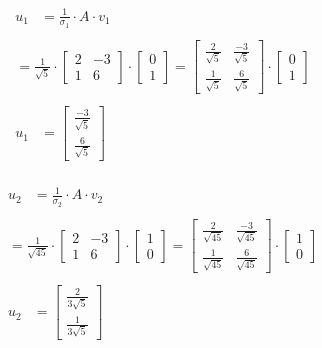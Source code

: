 \documentclass[a4paper]{report}
\begin{document}
\begin{align*}
\begin{split}
    u_1&=\frac{1}{\sigma_1}\cdot A\cdot v_1 
\end{split}\\
\begin{split}
    = \frac{1}{\sqrt{5}} \cdot\begin{bmatrix}
    2&-3\\1&6
\end{bmatrix} \cdot \begin{bmatrix}
    0\\1
\end{bmatrix} = \begin{bmatrix}
    \frac{2}{\sqrt{5}}&\frac{-3}{\sqrt{5}}\\\frac{1}{\sqrt{5}}&\frac{6}{\sqrt{5}}
\end{bmatrix} \cdot \begin{bmatrix}
    0\\1
\end{bmatrix}
\end{split} \\
\begin{split}
        u_1&= \begin{bmatrix}
    \frac{-3}{\sqrt{5}} \\ \frac{6}{\sqrt{5}}
\end{bmatrix}
\end{split}
\end{align*}



\begin{align*}
    \begin{split}
        u_2&=\frac{1}{\sigma_2}\cdot A\cdot v_2
    \end{split} \\
    \begin{split}
        = \frac{1}{\sqrt{45}} \cdot\begin{bmatrix}
    2&-3\\1&6
\end{bmatrix} \cdot \begin{bmatrix}
    1\\0
\end{bmatrix} = \begin{bmatrix}
    \frac{2}{\sqrt{45}}&\frac{-3}{\sqrt{45}}\\\frac{1}{\sqrt{45}}&\frac{6}{\sqrt{45}}
\end{bmatrix} \cdot \begin{bmatrix}
    1\\0
\end{bmatrix}
    \end{split} \\
    \begin{split}
       u_2&= \begin{bmatrix}
    \frac{2}{3\sqrt{5}} \\ \frac{1}{3\sqrt{5}}
\end{bmatrix} 
    \end{split}
\end{align*}
\end{document}
